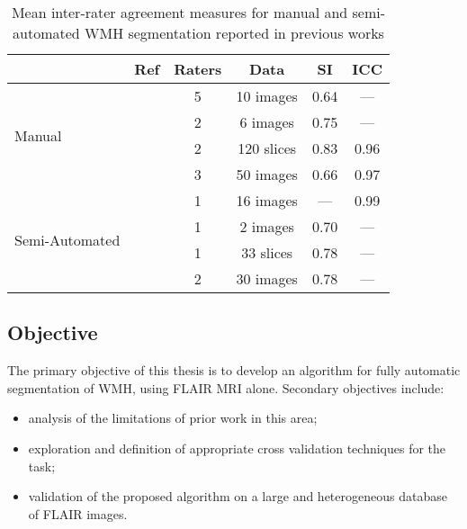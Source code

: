 \par
\begin{table}[h]
  \caption{Mean inter-rater agreement measures for manual and semi-automated WMH segmentation reported in previous works}
  \centering
  \begin{tabular}{lccccc}
  	\hline
  	                                &         Ref          & Raters &    Data    &  SI  & ICC  \\ \hline
  	\multirow{4}{*}{Manual}         & \cite{Harmouche2006} &   5    & 10 images  & 0.64 & ---  \\
  	                                &  \cite{DeBoer2009b}  &   2    &  6 images  & 0.75 & ---  \\
  	                                & \cite{Steenwijk2013} &   2    & 120 slices & 0.83 & 0.96 \\
  	                                &   \cite{Egger2017}   &   3    & 50 images  & 0.66 & 0.97 \\ \hline
  	\multirow{4}{*}{Semi-Automated} &   \cite{Payne2002}   &   1    & 16 images  & ---  & 0.99 \\
  	                                &  \cite{Ghazel2006}   &   1    &  2 images  & 0.70 & ---  \\
  	                                &  \cite{Kawata2010}   &   1    & 33 slices  & 0.78 & ---  \\
  	                                &   \cite{Iorio2013}   &   2    & 30 images  & 0.78 & ---  \\ \hline
  \end{tabular}
  \label{tab:interrater-cite}
\end{table}
\subsection{Objective}
The primary objective of this thesis is to develop an algorithm for fully automatic segmentation of WMH, using FLAIR MRI alone. Secondary objectives include:
\begin{itemize}
  \item analysis of the limitations of prior work in this area;
  \item exploration and definition of appropriate cross validation techniques for the task;
  \item validation of the proposed algorithm on a large and heterogeneous database of FLAIR images.
\end{itemize}
